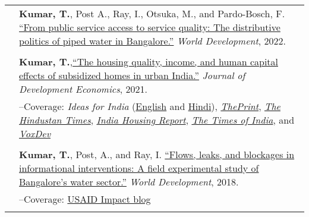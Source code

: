 \documentclass[letterpaper, 10pt]{article}
\begin{document}
\begin{longtable}{p{1.5in}p{5in}}
& \textbf{Kumar, T.}, Post A., Ray, I., Otsuka, M., and Pardo-Bosch, F. \href{https://doi.org/10.1016/j.worlddev.2021.105736}{``From public service access to service quality: The distributive politics of piped water in Bangalore.''} \textit{World Development}, 2022. \\

& \\

&\textbf{Kumar, T.},\href{https://doi.org/10.1016/j.jdeveco.2021.102738}{``The housing quality, income, and human capital effects of subsidized homes in urban India.''} \textit{Journal of Development Economics}, 2021.\\

&--\indent Coverage: \textit{Ideas for India} (\href{https://www.ideasforindia.in/topics/poverty-inequality/household-level-effects-of-affordable-housing-evidence-from-mumbai.html}{English} and \href{https://www.ideasforindia.in/topics/poverty-inequality/household-level-effects-of-affordable-housing-evidence-from-mumbai-hindi.html}{Hindi}), \href{https://theprint.in/opinion/mumbai-residents-win-govt-housing-lottery-and-spend-more-on-kids-education-jobs-study/290485/}{\textit{ThePrint}}, \href{https://www.hindustantimes.com/opinion/housing-is-a-welfare-weapon-it-can-help-people-escape-poverty-101629993983576.html}{\textit{The Hindustan Times}}, \href{https://indiahousingreport.in/outputs/opinion/housing-is-a-welfare-weapon-it-can-help-people-escape-poverty/}{\textit{India Housing Report}}, \href{https://timesofindia.indiatimes.com/city/mumbai/mhada-home-winners-see-upswing-in-family-edu-pay-in-mumbai-study/articleshow/86468320.cms}{\textit{The Times of India}}, and \href{https://voxdev.org/topic/infrastructure-urbanisation/household-level-effects-subsidised-housing-evidence-urban-india?utm_source=dlvr.it&utm_medium=twitter}{\textit{VoxDev}} \\
& \\

&\textbf{Kumar, T.}, Post, A., and Ray, I. \href{https://www.sciencedirect.com/science/article/pii/S0305750X1830032}{``Flows, leaks, and blockages in informational interventions: A field experimental study of Bangalore's water sector.''} \textit{World Development}, 2018.\\

&--\indent Coverage: \href{https://blog.usaid.gov/2016/05/using-mobile-phones-to-alert-households-waiting-for-nextdrop-of-water/}{USAID Impact blog} \\
& \\


\end{longtable}
\end{document}
